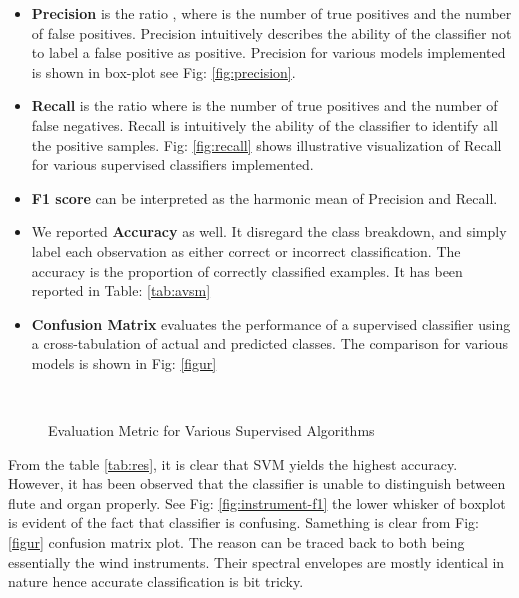 \documentclass[conference]{IEEEtran}
\begin{document}
\begin{itemize}
	\item \textbf{Precision} is the ratio , where  is the number of true positives and  the number of false positives. Precision intuitively describes the ability of the classifier not to label a false positive as positive. Precision for various models implemented is shown in box-plot see Fig: \ref{fig:precision}. 
	
	\item \textbf{Recall} is the ratio  where  is the number of true positives and  the number of false negatives. Recall is intuitively the ability of the classifier to identify all the positive samples. Fig: \ref{fig:recall} shows illustrative visualization of Recall for various supervised classifiers implemented. 
	
	\item \textbf{F1 score} can be interpreted as the harmonic mean of Precision and Recall. 
	
	\item We reported \textbf{Accuracy} as well. It disregard the class breakdown, and simply label each observation as either correct or incorrect classification. The accuracy is the proportion of correctly classified examples. It has been reported in Table: \ref{tab:avsm}
	\item \textbf{Confusion Matrix} evaluates the performance of a supervised classifier using a cross-tabulation of actual and predicted classes. The comparison for various models is shown in Fig: \ref{figur}
\end{itemize}

\begin{figure*}[ht]
	\centering
	
	\\
	\caption{Evaluation Metric for Various Supervised Algorithms}
\end{figure*}

From the table \ref{tab:res}, it is clear that SVM yields the highest accuracy. However, it has been observed that the classifier is unable to distinguish between flute and organ properly. See Fig: \ref{fig:instrument-f1} the lower whisker of boxplot is evident of the fact that classifier is confusing. Samething is clear from Fig: \ref{figur} confusion matrix plot. The reason can be traced back to both being essentially the wind instruments. Their spectral envelopes are mostly identical in nature hence accurate classification is bit tricky. 
\end{document}
